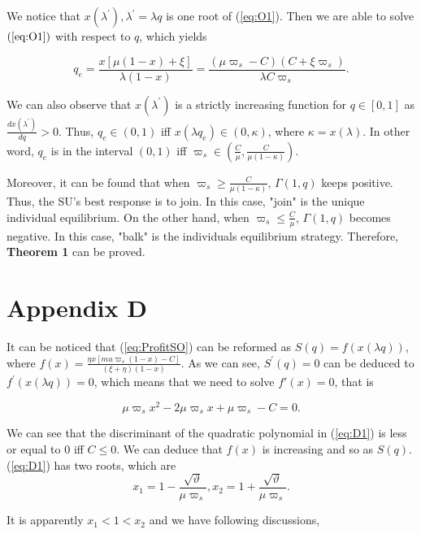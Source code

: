 \documentclass[journal]{IEEEtran}
\begin{document}
We notice that $x(\lambda^{'}), \lambda^{'} = \lambda q$ is
one root of (\ref{eq:O1}). Then we are able to solve
$(\ref{eq:O1})$ with respect to $q$, which yields

\begin{equation}
\label{eq:B2} q_e = \frac{x[\mu(1-x)+\xi]}{\lambda(1-x)}=
\frac{(\mu \varpi_s -C)(C + \xi \varpi_s)}{\lambda C \varpi_s }.
\end{equation}

We can also observe that $x(\lambda^{'})$ is a strictly
increasing function for $q \in [0,1]$ as $\frac{dx(\lambda^{'})}{d
q} >0$. Thus, $ q_e \in (0,1)$ iff $x(\lambda q_e) \in
(0,\kappa)$, where $\kappa = x(\lambda)$. In other word, $q_e$ is
in the interval $(0,1)$ iff $\varpi_s \in
(\frac{C}{\mu},\frac{C}{\mu(1-\kappa )})$. \par

Moreover, it can be found that when $\varpi_s \geq
\frac{C}{\mu(1-\kappa )}$, $\Gamma(1,q)$ keeps positive. Thus, the
SU's best response is to join. In this case, "join" is the unique
individual equilibrium. On the other hand, when $\varpi_s \leq
\frac{C}{\mu}$, $\Gamma(1,q)$ becomes negative. In this case,
"balk" is the individuals equilibrium strategy. Therefore,
\textbf{Theorem 1} can be proved.

\section*{Appendix D}

It can be noticed that (\ref{eq:ProfitSO}) can be reformed as
$S(q) = f(x(\lambda q))$, where $f(x) = \frac{\eta x[mu \varpi_s
(1-x)-C]}{(\xi + \eta )(1-x)}$. As we can see, $S^{'}(q) =0$ can
be deduced to $f^{'}(x(\lambda q))=0$, which means that we need to
solve $f'(x)=0$, that is

\begin{equation}
\label{eq:D1}
 \mu \varpi_s x^2 - 2 \mu \varpi_s x +\mu \varpi_s
-C=0.
\end{equation}

We can see that the discriminant of the quadratic polynomial in
(\ref{eq:D1}) is less or equal to $0$ iff $C \leq 0$. We can
deduce that $f(x)$ is increasing and so as $S(q)$. (\ref{eq:D1})
has two roots, which are
\begin{equation}
\label{eq:D2} x_1 = 1-\frac{\sqrt{\vartheta}}{\mu \varpi_s}, x_2 =
1+ \frac{\sqrt{\vartheta}}{\mu \varpi_s}.
\end{equation}

It is apparently $x_1<1<x_2$ and we have following discussions,
\end{document}
